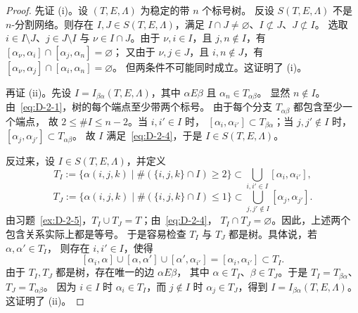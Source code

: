 \begin{proof}
先证 (i)。设 $(T,E,\Lambda)$ 为稳定的带 $n$ 个标号树。
反设 $S(T,E,\Lambda)$ 不是 $n$-分割网络。则存在
$I,J\in S(T,E,\Lambda)$，满足
$I\cap J\ne\varnothing$、$I\not\subset J$、$J\not\subset I$。
选取 $i\in I\setminus J$、$j\in J\setminus I$ 与
$\nu\in I\cap J$。由于 $\nu,i\in I$，且 $j,n\notin I$，有
$[\alpha_\nu,\alpha_i]\cap[\alpha_j,\alpha_n]=\varnothing$；
又由于 $\nu,j\in J$，且 $i,n\notin J$，有
$[\alpha_\nu,\alpha_j]\cap[\alpha_i,\alpha_n]=\varnothing$。
但两条件不可能同时成立。这证明了 (i)。

再证 (ii)。先设 $I=I_{\beta\alpha}(T,E,\Lambda)$，其中
$\alpha E\beta$ 且 $\alpha_n\in T_{\alpha\beta}$。
显然 $n\notin I$。由~\eqref{eq:D-2-1}，树的每个端点至少带两个标号。
由于每个分支 $T_{\alpha\beta}$ 都包含至少一个端点，
故 $2\le\#I\le n-2$。当 $i,i'\in I$ 时，
$[\alpha_i,\alpha_{i'}]\subset T_{\beta\alpha}$；当 $j,j'\notin I$ 时，
$[\alpha_j,\alpha_{j'}]\subset T_{\alpha\beta}$。
故 $I$ 满足~\eqref{eq:D-2-4}，于是 $I\in S(T,E,\Lambda)$。

反过来，设 $I\in S(T,E,\Lambda)$，并定义
\[
  T_I:=\{\alpha(i,j,k)\mid\#(\{i,j,k\}\cap I)\ge2\}
    \subset\bigcup_{i,i'\in I}[\alpha_i,\alpha_{i'}],
\]
\[
  T_J:=\{\alpha(i,j,k)\mid\#(\{i,j,k\}\cap I)\le1\}
    \subset\bigcup_{j,j'\notin I}[\alpha_j,\alpha_{j'}].
\]
由习题~\ref{ex:D-2-5}，$T_I\cup T_J=T$；由~\eqref{eq:D-2-4}，
$T_I\cap T_J=\varnothing$。因此，上述两个包含关系实际上都是等号。
于是容易检查 $T_I$ 与 $T_J$ 都是树。具体说，若
$\alpha,\alpha'\in T_I$，
则存在 $i,i'\in I$，使得
\[
  [\alpha_i,\alpha]\cup[\alpha,\alpha']\cup
  [\alpha',\alpha_{i'}]=[\alpha_i,\alpha_{i'}]\subset T_I.
\]
由于 $T_I,T_J$ 都是树，存在唯一的边 $\alpha E\beta$，
其中 $\alpha\in T_I$、$\beta\in T_J$。于是
$T_I=T_{\beta\alpha}$、$T_J=T_{\alpha\beta}$。
因为 $i\in I$ 时 $\alpha_i\in T_I$，而 $j\notin I$ 时
$\alpha_j\in T_J$，得到 $I=I_{\beta\alpha}(T,E,\Lambda)$。
这证明了 (ii)。


\end{proof}
